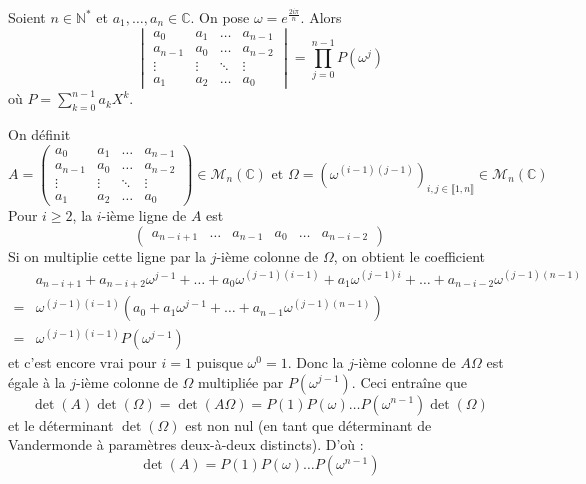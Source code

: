 





	\begin{lemma}
		\label{suite-de-polygones-1}
		Soient $n \in \mathbb{N}^*$ et $a_1, \dots, a_n \in \mathbb{C}$. On pose $\omega = e^{\frac{2i\pi}{n}}$. Alors
		\[ \begin{vmatrix} a_0 & a_1 & \dots & a_{n-1} \\ a_{n-1} & a_0 & \dots & a_{n-2}\\ \vdots & \vdots & \ddots & \vdots \\ a_1 & a_2 & \dots & a_0 \end{vmatrix} = \prod_{j=0}^{n-1} P(\omega^j) \]
		où $P = \sum_{k=0}^{n-1} a_k X^k$.
	\end{lemma}

	\begin{demonstration}
		On définit
		\[ A = \begin{pmatrix} a_0 & a_1 & \dots & a_{n-1} \\ a_{n-1} & a_0 & \dots & a_{n-2}\\ \vdots & \vdots & \ddots & \vdots \\ a_1 & a_2 & \dots & a_0 \end{pmatrix} \in \mathcal{M}_n(\mathbb{C}) \text{ et } \Omega = (\omega^{(i-1)(j-1)})_{i, j \in \llbracket 1, n \rrbracket} \in \mathcal{M}_n(\mathbb{C}) \]
		Pour $i \geq 2$, la $i$-ième ligne de $A$ est
		\[ \begin{pmatrix} a_{n-i+1} & \dots & a_{n-1} & a_0 & \dots & a_{n-i-2} \end{pmatrix} \]
		Si on multiplie cette ligne par la $j$-ième colonne de $\Omega$, on obtient le coefficient
		\begin{align*}
			&a_{n-i+1} + a_{n-i+2} \omega^{j-1} + \dots + a_0 \omega^{(j-1)(i-1)} + a_1 \omega^{(j-1)i} + \dots + a_{n-i-2} \omega^{(j-1)(n-1)} \\
			=& \omega^{(j-1)(i-1)} (a_0 + a_1 \omega^{j-1} + \dots + a_{n-1} \omega^{(j-1)(n-1)}) \\
			=& \omega^{(j-1)(i-1)} P(\omega^{j-1})
		\end{align*}
		et c'est encore vrai pour $i = 1$ puisque $\omega^0 = 1$. Donc la $j$-ième colonne de $A \Omega$ est égale à la $j$-ième colonne de $\Omega$ multipliée par $P(\omega^{j-1})$. Ceci entraîne que
		\[ \det(A) \det(\Omega) = \det(A\Omega) = P(1) P(\omega) \dots P(\omega^{n-1}) \det(\Omega) \]
		et le déterminant $\det(\Omega)$ est non nul (en tant que déterminant de Vandermonde à paramètres deux-à-deux distincts). D'où :
		\[ \det(A) = P(1) P(\omega) \dots P(\omega^{n-1}) \]
	\end{demonstration}

